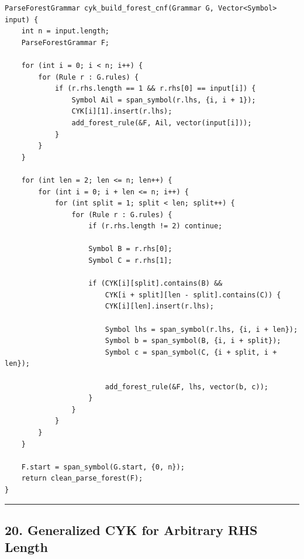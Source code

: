 \documentclass[10pt,letterpaper]{article}
\begin{document}
\begin{verbatim}
ParseForestGrammar cyk_build_forest_cnf(Grammar G, Vector<Symbol> input) {
    int n = input.length;
    ParseForestGrammar F;

    for (int i = 0; i < n; i++) {
        for (Rule r : G.rules) {
            if (r.rhs.length == 1 && r.rhs[0] == input[i]) {
                Symbol Ail = span_symbol(r.lhs, {i, i + 1});
                CYK[i][1].insert(r.lhs);
                add_forest_rule(&F, Ail, vector(input[i]));
            }
        }
    }

    for (int len = 2; len <= n; len++) {
        for (int i = 0; i + len <= n; i++) {
            for (int split = 1; split < len; split++) {
                for (Rule r : G.rules) {
                    if (r.rhs.length != 2) continue;

                    Symbol B = r.rhs[0];
                    Symbol C = r.rhs[1];

                    if (CYK[i][split].contains(B) &&
                        CYK[i + split][len - split].contains(C)) {
                        CYK[i][len].insert(r.lhs);

                        Symbol lhs = span_symbol(r.lhs, {i, i + len});
                        Symbol b = span_symbol(B, {i, i + split});
                        Symbol c = span_symbol(C, {i + split, i + len});

                        add_forest_rule(&F, lhs, vector(b, c));
                    }
                }
            }
        }
    }

    F.start = span_symbol(G.start, {0, n});
    return clean_parse_forest(F);
}
\end{verbatim}

\medskip\hrule\medskip

\subsection*{20. Generalized CYK for Arbitrary RHS Length}
\end{document}
